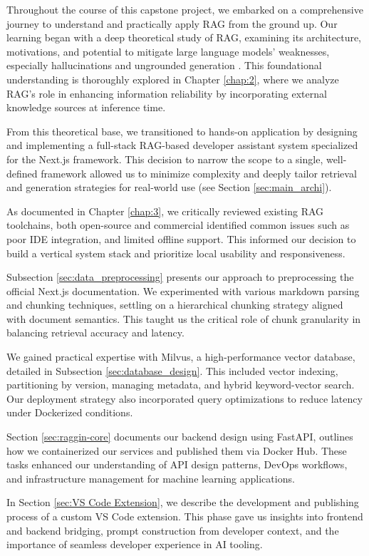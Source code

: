 Throughout the course of this capstone project, we embarked on a comprehensive journey to understand and practically apply RAG from the ground up. Our learning began with a deep theoretical study of RAG, examining its architecture, motivations, and potential to mitigate large language models' weaknesses, especially hallucinations and ungrounded generation \cite{gao2023ragllmsurvey}. This foundational understanding is thoroughly explored in Chapter \ref{chap:2}, where we analyze RAG's role in enhancing information reliability by incorporating external knowledge sources at inference time.

From this theoretical base, we transitioned to hands-on application by designing and implementing a full-stack RAG-based developer assistant system specialized for the Next.js framework. This decision to narrow the scope to a single, well-defined framework allowed us to minimize complexity and deeply tailor retrieval and generation strategies for real-world use (see Section \ref{sec:main_archi}).

As documented in Chapter \ref{chap:3}, we critically reviewed existing RAG toolchains, both open-source and commercial identified common issues such as poor IDE integration, and limited offline support. This informed our decision to build a vertical system stack and prioritize local usability and responsiveness.

Subsection \ref{sec:data_preprocessing} presents our approach to preprocessing the official Next.js documentation. We experimented with various markdown parsing and chunking techniques, settling on a hierarchical chunking strategy aligned with document semantics. This taught us the critical role of chunk granularity in balancing retrieval accuracy and latency.

We gained practical expertise with Milvus, a high-performance vector database, detailed in Subsection \ref{sec:database_design}. This included vector indexing, partitioning by version, managing metadata, and hybrid keyword-vector search. Our deployment strategy also incorporated query optimizations to reduce latency under Dockerized conditions.

Section \ref{sec:raggin-core} documents our backend design using FastAPI, outlines how we containerized our services and published them via Docker Hub. These tasks enhanced our understanding of API design patterns, DevOps workflows, and infrastructure management for machine learning applications.

In Section \ref{sec:VS Code Extension}, we describe the development and publishing process of a custom VS Code extension. This phase gave us insights into frontend and backend bridging, prompt construction from developer context, and the importance of seamless developer experience in AI tooling.

